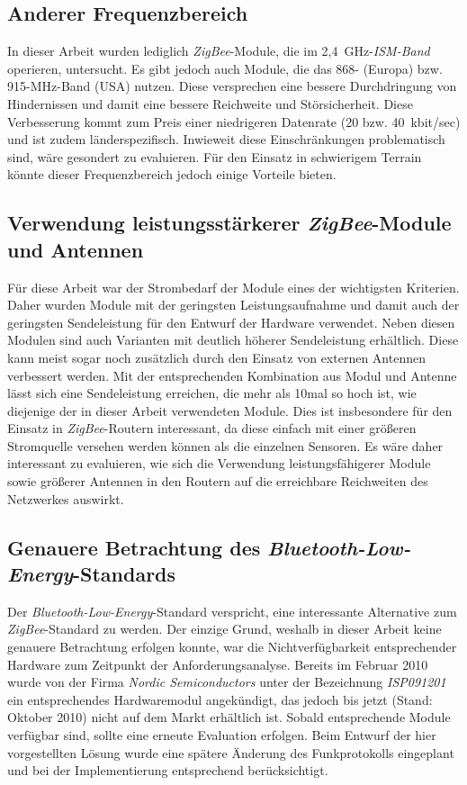 \subsection{Anderer Frequenzbereich}
In dieser Arbeit wurden lediglich \emph{ZigBee}-Module, die im 2,4~GHz-\emph{ISM-Band} operieren, untersucht. Es gibt
jedoch auch Module, die das 868- (Europa) bzw. 915-MHz-Band (USA) nutzen. Diese versprechen eine bessere Durchdringung
von Hindernissen und damit eine bessere Reichweite und Störsicherheit. Diese Verbesserung kommt zum Preis einer
niedrigeren Datenrate (20 bzw. 40~kbit/sec) und ist zudem länderspezifisch. Inwieweit diese Einschränkungen problematisch
sind, wäre gesondert zu evaluieren. Für den Einsatz in schwierigem Terrain könnte dieser Frequenzbereich jedoch einige
Vorteile bieten.

\subsection{Verwendung leistungsstärkerer \emph{ZigBee}-Module und Antennen}
Für diese Arbeit war der Strombedarf der Module eines der wichtigsten Kriterien. Daher wurden Module mit der geringsten
Leistungsaufnahme und damit auch der geringsten Sendeleistung für den Entwurf der Hardware verwendet. Neben diesen
Modulen sind auch Varianten mit deutlich höherer Sendeleistung erhältlich. Diese kann meist sogar noch zusätzlich durch
den Einsatz von externen Antennen verbessert werden. Mit der entsprechenden Kombination aus Modul und Antenne lässt sich eine
Sendeleistung erreichen, die mehr als 10mal so hoch ist, wie diejenige der in dieser Arbeit verwendeten Module. Dies ist 
insbesondere für den Einsatz in \emph{ZigBee}-Routern interessant, da diese einfach mit einer größeren Stromquelle versehen
werden können als die einzelnen Sensoren. Es wäre daher interessant zu evaluieren, wie sich die Verwendung 
leistungsfähigerer Module sowie größerer Antennen in den Routern auf die erreichbare Reichweiten des Netzwerkes auswirkt.

\subsection{Genauere Betrachtung des \emph{Bluetooth-Low-Energy}-Stan\-dards}
Der \emph{Bluetooth-Low-Energy}-Standard verspricht, eine interessante Alternative zum \emph{ZigBee}-Standard zu werden.
Der einzige Grund, weshalb in dieser Arbeit keine genauere Betrachtung erfolgen konnte, war die Nichtverfügbarkeit
entsprechender Hardware zum Zeitpunkt der Anforderungsanalyse. Bereits im Februar 2010 wurde von der Firma 
\emph{Nordic Semiconductors} unter der Bezeichnung \emph{ISP091201} ein entsprechendes Hardwaremodul angekündigt,
das jedoch bis jetzt (Stand: Oktober 2010) nicht auf dem Markt erhältlich ist. Sobald entsprechende Module verfügbar
sind, sollte eine erneute Evaluation erfolgen. Beim Entwurf der hier vorgestellten Lösung wurde eine spätere Änderung
des Funkprotokolls eingeplant und bei der Implementierung entsprechend berücksichtigt.
